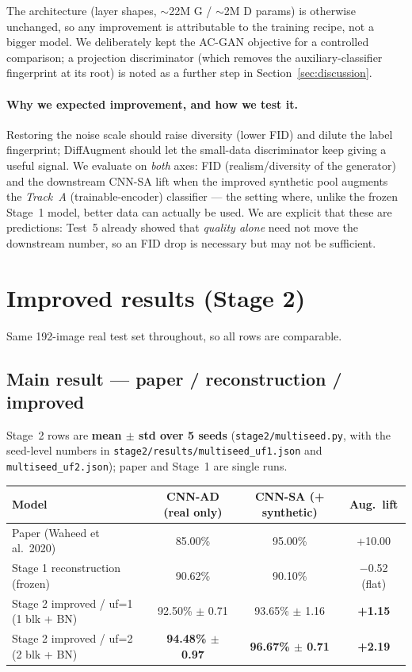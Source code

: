 \documentclass[11pt]{article}
\newcommand{\code}[1]{\texttt{#1}}
\begin{document}
The architecture (layer shapes, $\sim$22M G / $\sim$2M D params) is otherwise
unchanged, so any improvement is attributable to the training recipe, not a bigger
model. We deliberately kept the AC-GAN objective for a controlled comparison; a
projection discriminator (which removes the auxiliary-classifier fingerprint at its
root) is noted as a further step in Section~\ref{sec:discussion}.

\paragraph{Why we expected improvement, and how we test it.} Restoring the noise
scale should raise diversity (lower FID) and dilute the label fingerprint;
DiffAugment should let the small-data discriminator keep giving a useful signal.
We evaluate on \emph{both} axes: FID (realism/diversity of the generator) and the
downstream CNN-SA lift when the improved synthetic pool augments the \emph{Track~A}
(trainable-encoder) classifier --- the setting where, unlike the frozen Stage~1
model, better data can actually be used. We are explicit that these are
predictions: Test~5 already showed that \emph{quality alone} need not move the
downstream number, so an FID drop is necessary but may not be sufficient.

\section{Improved results (Stage 2)}

Same 192-image real test set throughout, so all rows are comparable.

\subsection{Main result --- paper / reconstruction / improved}
\label{sec:mainresult}
Stage~2 rows are \textbf{mean $\pm$ std over 5 seeds} (\code{stage2/multiseed.py},
with the seed-level numbers in \code{stage2/results/multiseed\_uf1.json} and
\code{multiseed\_uf2.json}); paper and Stage~1 are single runs.

\begin{table}[htbp]
\centering\small
\begin{tabular}{@{}lccc@{}}
\toprule
\textbf{Model} & \textbf{CNN-AD (real only)} & \textbf{CNN-SA (+ synthetic)} & \textbf{Aug.\ lift} \\
\midrule
Paper (Waheed et al.\ 2020) & 85.00\% & 95.00\% & +10.00 \\
Stage 1 reconstruction (frozen) & 90.62\% & 90.10\% & $-$0.52 (flat) \\
Stage 2 improved / uf=1 (1 blk + BN) & 92.50\% $\pm$ 0.71 & 93.65\% $\pm$ 1.16 & \textbf{+1.15} \\
Stage 2 improved / uf=2 (2 blk + BN) & \textbf{94.48\% $\pm$ 0.97} & \textbf{96.67\% $\pm$ 0.71} & \textbf{+2.19} \\
\bottomrule
\end{tabular}
\end{table}
\end{document}
